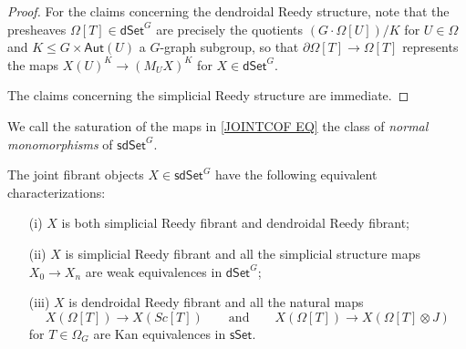 \documentclass[a4paper,10pt
,draft
]{article}%
\begin{document}
\begin{proof}
	For the claims concerning the dendroidal Reedy structure, 
	note that the presheaves $\Omega[T] \in \mathsf{dSet}^G$
	are precisely the quotients $(G \cdot \Omega[U])/K$ for $U\in \Omega$ and $K \leq G \times \mathsf{Aut}(U)$ a $G$-graph subgroup,
	so that $\partial \Omega[T] \to \Omega[T]$
	represents the maps $X(U)^K \to (M_U X)^K$ for $X \in \mathsf{dSet}^G$.
	
	The claims concerning the simplicial Reedy structure are immediate.
\end{proof}


We call the saturation of the maps in \eqref{JOINTCOF EQ} the class of \textit{normal monomorphisms} of $\mathsf{sdSet}^G$.

\begin{corollary}\label{JOINTFIBCHAR COR}
The joint fibrant objects $X \in \mathsf{sdSet}^G$ have the following equivalent characterizations:
\begin{itemize}
	\item[(i)] $X$ is both simplicial Reedy fibrant and dendroidal Reedy fibrant;
	\item[(ii)] $X$ is simplicial Reedy fibrant and all the simplicial structure maps 
	$X_0 \to X_n$ are weak equivalences in $\mathsf{dSet}^{G}$;
	\item[(iii)] $X$ is dendroidal Reedy fibrant and all the natural maps
\[
	X\left(\Omega[T]\right) \to X\left(Sc[T]\right)
\qquad \text{and} \qquad
	X\left(\Omega[T]\right) \to X(\Omega[T]\otimes J)
\]
for $T \in \Omega_G$ are Kan equivalences in $\mathsf{sSet}$.
\end{itemize}
\end{corollary}
\end{document}
